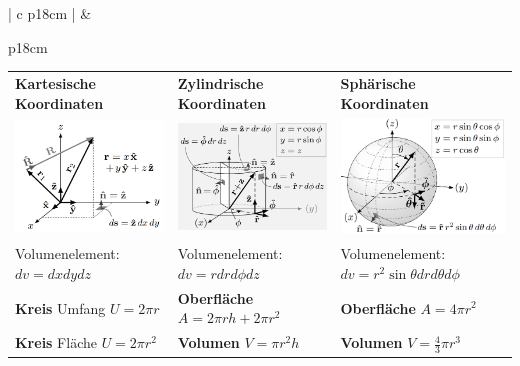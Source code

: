 
	\begin{tabular}{ | c   p{18cm} |}
	\hline
	\rotcell{\large\textbf{\textcolor{white}{Geometrie}}}  &
		\begin{tabular}{p{18cm}}	
			\setlength{\extrarowheight}{10pt}			
			\begin{tabular}{L{5.6cm}| L{5.6cm}| L{5.8cm}}
				
				
				
				 \textbf{Kartesische Koordinaten}& \textbf{Zylindrische Koordinaten} & \textbf{Sphärische Koordinaten}\\
				 \includegraphics[width=5.6cm]{kartesische.png}& \includegraphics[width=5.6cm]{zylindrische.png}& \includegraphics[width=5.6cm]{spherische.png}\\
				Volumenelement: $ d v=d x d y d z$&Volumenelement: $d v = r d r d \phi d z$&Volumenelement: $d v=r^{2} \sin \theta d r d \theta d \phi$\\
				\textbf{Kreis} Umfang $U=2\pi r$&\textbf{Oberfläche} $A=2\pi rh+2\pi r^2$ & \textbf{Oberfläche} $A=4\pi r^2$ \\
				\textbf{Kreis} Fläche $U=2\pi r^2$&\textbf{Volumen} $V=\pi r^2h$ & \textbf{Volumen} $V=\frac{4}{3}\pi r^3$ \\
				

\end{tabular}
\end{tabular}
\end{tabular}
